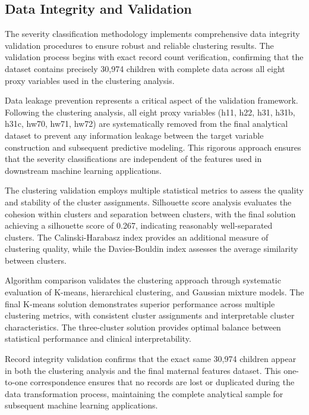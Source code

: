 \documentclass[12pt]{report}
\begin{document}
\subsection{Data Integrity and Validation}

The severity classification methodology implements comprehensive data integrity validation procedures to ensure robust and reliable clustering results. The validation process begins with exact record count verification, confirming that the dataset contains precisely 30,974 children with complete data across all eight proxy variables used in the clustering analysis.

Data leakage prevention represents a critical aspect of the validation framework. Following the clustering analysis, all eight proxy variables (h11, h22, h31, h31b, h31c, hw70, hw71, hw72) are systematically removed from the final analytical dataset to prevent any information leakage between the target variable construction and subsequent predictive modeling. This rigorous approach ensures that the severity classifications are independent of the features used in downstream machine learning applications.

The clustering validation employs multiple statistical metrics to assess the quality and stability of the cluster assignments. Silhouette score analysis evaluates the cohesion within clusters and separation between clusters, with the final solution achieving a silhouette score of 0.267, indicating reasonably well-separated clusters. The Calinski-Harabasz index provides an additional measure of clustering quality, while the Davies-Bouldin index assesses the average similarity between clusters.

Algorithm comparison validates the clustering approach through systematic evaluation of K-means, hierarchical clustering, and Gaussian mixture models. The final K-means solution demonstrates superior performance across multiple clustering metrics, with consistent cluster assignments and interpretable cluster characteristics. The three-cluster solution provides optimal balance between statistical performance and clinical interpretability.

Record integrity validation confirms that the exact same 30,974 children appear in both the clustering analysis and the final maternal features dataset. This one-to-one correspondence ensures that no records are lost or duplicated during the data transformation process, maintaining the complete analytical sample for subsequent machine learning applications.
\end{document}
